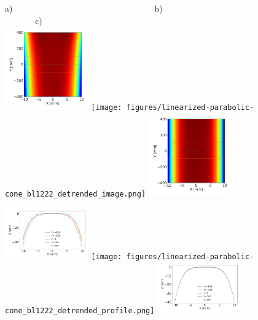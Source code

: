 \documentclass[]{article}
\begin{document}
  

\thispagestyle{empty}


\begin{figure}\label{fig:detrendedBeamline}
\flushleft
a)~~~~~~~~~~~~~~~~~~~~~~~~~~~~~~~~~b)~~~~~~~~~~~~~~~~~~~~~~~~~~~~~~c)\\
\centering
\includegraphics[width=0.32\textwidth]{figures/diaboloid_bl1222_detrended_image.png} 
\texttt{[image: figures/linearized-parabolic-cone\_bl1222\_detrended\_image.png]} 
\includegraphics[width=0.32\textwidth]{figures/ellipticalcylinder_bl1222_detrended_image.png} 

\includegraphics[width=0.32\textwidth]{figures/diaboloid_bl1222_detrended_profile.png}
\texttt{[image: figures/linearized-parabolic-cone\_bl1222\_detrended\_profile.png]}
\includegraphics[width=0.32\textwidth]{figures/ellipticalcylinder_bl1222_detrended_profile.png}

\end{figure}

\end{document}

